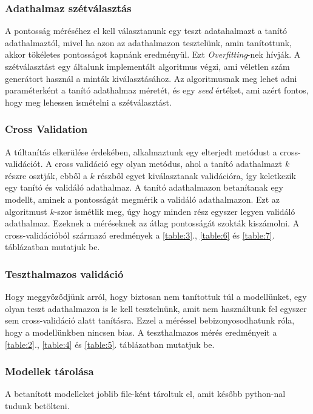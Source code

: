 \documentclass[12pt,a4paper]{article}
\begin{document}
\subsubsection{Adathalmaz szétválasztás}
A pontosság méréséhez el kell választanunk egy teszt adatahalmazt a tanító adathalmaztól, mivel ha azon az adathalmazon tesztelünk, amin tanítottunk,
akkor tökéletes pontosságot kapnánk eredményül. Ezt \emph{Overfitting}-nek hívják. A szétválasztást egy általunk implementált algoritmus végzi, ami véletlen szám generátort használ a
minták kiválasztásához. Az algoritmusnak meg lehet adni paraméterként a tanító adathalmaz méretét, és egy \emph{seed} értéket, ami azért fontos, hogy meg
lehessen ismételni a szétválasztást.
\subsubsection{Cross Validation}
A túltanítás elkerülése érdekében, alkalmaztunk egy elterjedt metódust a cross-validációt. A cross validáció egy olyan metódus, ahol a tanító adathalmazt
$k$ részre osztják, ebből a $k$ részből egyet kiválasztanak validációra, így keletkezik egy tanító és validáló adathalmaz. A tanító adathalmazon betanítanak
egy modellt, aminek a pontosságát megmérik a validáló adathalmazon. Ezt az algoritmust $k$-szor ismétlik meg, úgy hogy minden rész egyszer legyen validáló
adathalmaz. Ezeknek a méréseknek az átlag pontosságát szokták kiszámolni. A cross-validációból származó eredmények a \ref{table:3}., \ref{table:6} és \ref{table:7}.
táblázatban mutatjuk be.
\subsubsection{Teszthalmazos validáció}
Hogy meggyőződjünk arról, hogy biztosan nem tanítottuk túl a modellünket, egy olyan teszt adathalmazon is le kell tesztelnünk, amit nem használtunk fel egyszer sem
cross-validáció alatt tanításra. Ezzel a méréssel bebizonyosodhatunk róla, hogy a modellünkben nincsen bias. A teszthalmazos mérés eredményeit a \ref{table:2}., \ref{table:4} és \ref{table:5}.
táblázatban mutatjuk be.
\subsubsection{Modellek tárolása}
A betanított modelleket joblib file-ként tároltuk el, amit később python-nal tudunk betölteni.

\newpage
\end{document}
